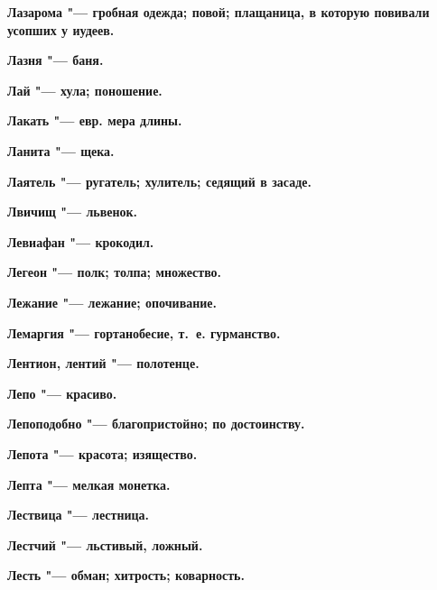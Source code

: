 \begin{mymulticols}{2}
\bfseries Лазарома\normalfont{} "--- гробная одежда; повой; плащаница, в которую повивали усопших у иудеев. 




\bfseries Лазня\normalfont{} "--- баня. 




\bfseries Лай\normalfont{} "--- хула; поношение. 




\bfseries Лакать\normalfont{} "--- евр. мера длины. 




\bfseries Ланита\normalfont{} "--- щека. 




\bfseries Лаятель\normalfont{} "--- ругатель; хулитель; седящий в засаде. 




\bfseries Лвичищ\normalfont{} "--- львенок. 




\bfseries Левиафан\normalfont{} "--- крокодил. 




\bfseries Легеон\normalfont{} "--- полк; толпа; множество. 




\bfseries Лежание\normalfont{} "--- лежание; опочивание. 




\bfseries Лемаргия\normalfont{} "--- гортанобесие, т.~е. гурманство. 




\bfseries Лентион, лентий\normalfont{} "--- полотенце. 




\bfseries Лепо\normalfont{} "--- красиво. 




\bfseries Лепоподобно\normalfont{} "--- благопристойно; по достоинству. 




\bfseries Лепота\normalfont{} "--- красота; изящество. 




\bfseries Лепта\normalfont{} "--- мелкая монетка. 




\bfseries Лествица\normalfont{} "--- лестница. 




\bfseries Лестчий\normalfont{} "--- льстивый, ложный. 




\bfseries Лесть\normalfont{} "--- обман; хитрость; коварность. 





\end{mymulticols}

